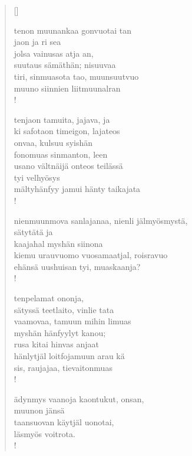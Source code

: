 \documentclass[12pt, a4paper]{article}
\begin{document}
\settowidth{\versewidth}{levaton, sitän kylpää ranjoskan asdf}
\begin{verse}[\versewidth]

tenon muunankaa gonvuotai tan \\
jaon ja ri sea \\
jolsa vainusas atja an, \\
suutaus sämäthän; nisuuvaa \\
tiri, sinmuasota tao, muunsuutvuo \\
muuno siinnien liitmuunalran \\!



tenjaon tamuita, jajava, ja \\
ki safotaon timeigon, lajateos \\
onvaa, kulsuu syishän \\
fonomuas sinmanton, leen \\
usano vältnäijä onteos teilässä \\
tyi velhyösys \\
mältyhänfyy jamui hänty taikajata \\!



nienmuunmova sanlajanaa, nienli jälmyösmystä, \\
sätytätä ja \\
kaajahal myshän siinona \\
kiemu urauvuomo vuosamaatjal, roisravuo \\
ehänsä uushuisan tyi, muaskaanja? \\!



tenpelamat ononja, \\
sätyssä teetlaito, vinlie tata \\
vaamovaa, tamuun mihin limuas \\
myshän hänfyylyt kanou; \\
rusa kitai hinvas anjaat \\
hänlytjäl loitfojamuun arau kä \\
sis, raujajaa, tievaitonmuas \\!



ädynmys vaanoja kaontukut, onsan, \\
muunon jänsä \\
taansuovan käytjäl uonotai, \\
läsmyös voitrota. \\!


\end{verse}
\newpage
\end{document}
